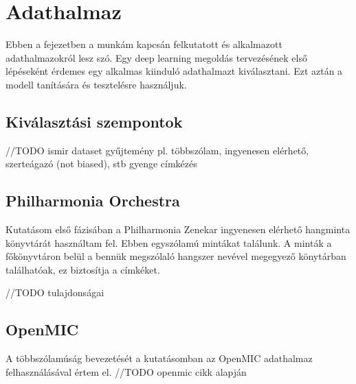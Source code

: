 \chapter{Adathalmaz}
\label{ch:dataset}

Ebben a fejezetben a munkám kapcsán felkutatott és alkalmazott adathalmazokról lesz szó. Egy deep learning megoldás tervezésének első lépéseként érdemes egy alkalmas kiinduló adathalmazt kiválasztani. Ezt aztán a modell tanítására és tesztelésre használjuk.

\section{Kiválasztási szempontok}

//TODO ismir dataset gyűjtemény
pl. többszólam, ingyenesen elérhető, szerteágazó (not biased), stb gyenge címkézés

\section{Philharmonia Orchestra}

Kutatásom első fázisában a Philharmonia Zenekar ingyenesen elérhető hangminta könyvtárát használtam fel. Ebben egyszólamú mintákat találunk. A minták a főkönyvtáron belül a bennük megszólaló hangszer nevével megegyező könytárban találhatóak, ez biztosítja a címkéket. 

//TODO tulajdonságai

\section{OpenMIC}

A többszólamúság bevezetését a kutatásomban az OpenMIC \cite{humphrey2018openmic} adathalmaz felhasználásával értem el.  
//TODO  openmic cikk alapján